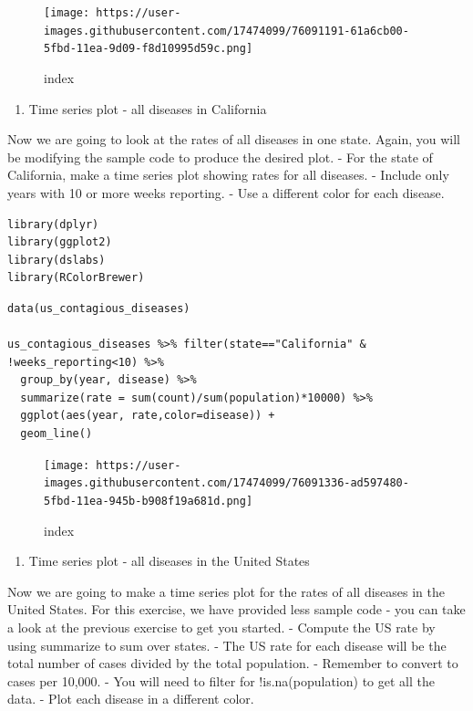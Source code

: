 \documentclass[
]{article}
\providecommand{\tightlist}{%
  \setlength{\itemsep}{0pt}\setlength{\parskip}{0pt}}
\begin{document}
\begin{figure}
\centering
\texttt{[image: https://user-images.githubusercontent.com/17474099/76091191-61a6cb00-5fbd-11ea-9d09-f8d10995d59c.png]}
\caption{index}
\end{figure}

\begin{enumerate}
\def\labelenumi{\arabic{enumi}.}
\setcounter{enumi}{2}
\tightlist
\item
  Time series plot - all diseases in California
\end{enumerate}

Now we are going to look at the rates of all diseases in one state.
Again, you will be modifying the sample code to produce the desired
plot. - For the state of California, make a time series plot showing
rates for all diseases. - Include only years with 10 or more weeks
reporting. - Use a different color for each disease.

\begin{verbatim}
library(dplyr)
library(ggplot2)
library(dslabs)
library(RColorBrewer)
\end{verbatim}

\begin{verbatim}
data(us_contagious_diseases)

us_contagious_diseases %>% filter(state=="California" & !weeks_reporting<10) %>% 
  group_by(year, disease) %>%
  summarize(rate = sum(count)/sum(population)*10000) %>%
  ggplot(aes(year, rate,color=disease)) + 
  geom_line()
\end{verbatim}

\begin{figure}
\centering
\texttt{[image: https://user-images.githubusercontent.com/17474099/76091336-ad597480-5fbd-11ea-945b-b908f19a681d.png]}
\caption{index}
\end{figure}

\begin{enumerate}
\def\labelenumi{\arabic{enumi}.}
\setcounter{enumi}{3}
\tightlist
\item
  Time series plot - all diseases in the United States
\end{enumerate}

Now we are going to make a time series plot for the rates of all
diseases in the United States. For this exercise, we have provided less
sample code - you can take a look at the previous exercise to get you
started. - Compute the US rate by using summarize to sum over states. -
The US rate for each disease will be the total number of cases divided
by the total population. - Remember to convert to cases per 10,000. -
You will need to filter for !is.na(population) to get all the data. -
Plot each disease in a different color.
\end{document}
